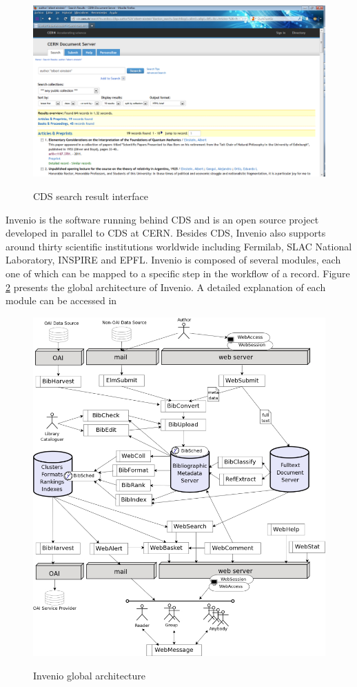 \begin{figure}
\centering
\includegraphics[height=7 cm]{figures/cds_screenshot.png}
\label{cds_screenshot}
\caption{CDS search result interface}
\end{figure}
 


Invenio\cite{invenio} is the software running behind CDS and is an open source project developed in parallel to CDS at CERN. Besides CDS, Invenio also supports around thirty scientific institutions worldwide including Fermilab, SLAC National Laboratory, INSPIRE and EPFL. 
Invenio is composed of several modules, each one of which can be mapped to a specific step in the workflow of a record. Figure \ref{invenio_architecture} presents the global architecture of Invenio. A detailed explanation of each module can be accessed in \cite{invenio_modules} 

\begin{figure}
\centering
\includegraphics[height=10 cm]{figures/invenio.jpeg}
\label{invenio_architecture}
\caption{Invenio global architecture}
\end{figure}


